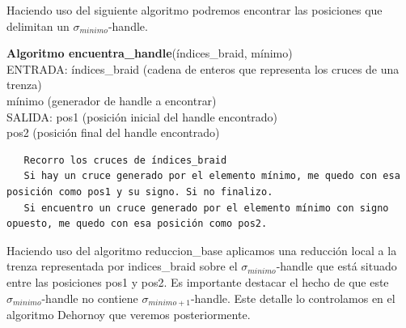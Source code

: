 Haciendo uso del siguiente algoritmo podremos encontrar las posiciones que delimitan un $\sigma_{minimo}$-handle.
\begin{alg}
	\textbf{Algoritmo encuentra\_handle}(índices\_braid, mínimo)\\
	ENTRADA: índices\_braid (cadena de enteros que representa los cruces de una trenza)\\
	\hspace*{2.2cm} mínimo (generador de handle a encontrar) \\
	SALIDA: \hspace{0.4cm} pos1 (posición inicial del handle encontrado) \\
	\hspace*{2.2cm} pos2 (posición final del handle encontrado)
	
\begin{lstlisting}
   Recorro los cruces de índices_braid
   Si hay un cruce generado por el elemento mínimo, me quedo con esa posición como pos1 y su signo. Si no finalizo.
   Si encuentro un cruce generado por el elemento mínimo con signo opuesto, me quedo con esa posición como pos2.
\end{lstlisting}
\end{alg}

\bigskip
Haciendo uso del algoritmo reduccion\_base aplicamos una reducción local a la trenza representada por indices\_braid sobre el $\sigma_{minimo}$-handle que está situado entre las posiciones pos1 y pos2. Es importante destacar el hecho de que este $\sigma_{minimo}$-handle  no contiene $\sigma_{minimo+1}$-handle. Este detalle lo controlamos en el algoritmo Dehornoy que veremos posteriormente. \\

